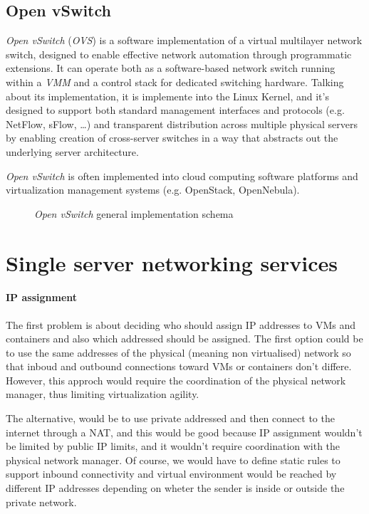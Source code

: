 \subsection{Open vSwitch}
\emph{Open vSwitch} (\emph{OVS}) is a software implementation of a virtual
multilayer network switch, designed to enable effective network automation
through programmatic extensions. It can operate both as a software-based network
switch running within a \emph{VMM} and a control stack for dedicated switching
hardware. Talking about its implementation, it is implemente into the Linux
Kernel, and it's designed to support both standard management interfaces and
protocols (e.g. NetFlow, sFlow, \dots) and transparent distribution across
multiple physical servers by enabling creation of cross-server switches in a way
that abstracts out the underlying server architecture.

\begin{note}
    \emph{Open vSwitch} is often implemented into cloud computing software
    platforms and virtualization management systems (e.g. OpenStack, OpenNebula).
\end{note}

\begin{figure}[h!]
    \centering
    \caption{\emph{Open vSwitch} general implementation schema}
\end{figure}

\section{Single server networking services}
\paragraph{IP assignment}
The first problem is about deciding who should assign IP addresses to VMs and
containers and also which addressed should be assigned. The first option could
be to use the same addresses of the physical (meaning non virtualised) network
so that inboud and outbound connections toward VMs or containers don't differe.
However, this approch would require the coordination of the physical network
manager, thus limiting virtualization agility.

The alternative, would be to use private addressed and then connect to the
internet through a NAT, and this would be good because IP assignment wouldn't
be limited by public IP limits, and it wouldn't require coordination with the
physical network manager. Of course, we would have to define static rules to
support inbound connectivity and virtual environment would be reached by
different IP addresses depending on wheter the sender is inside or outside the
private network.

